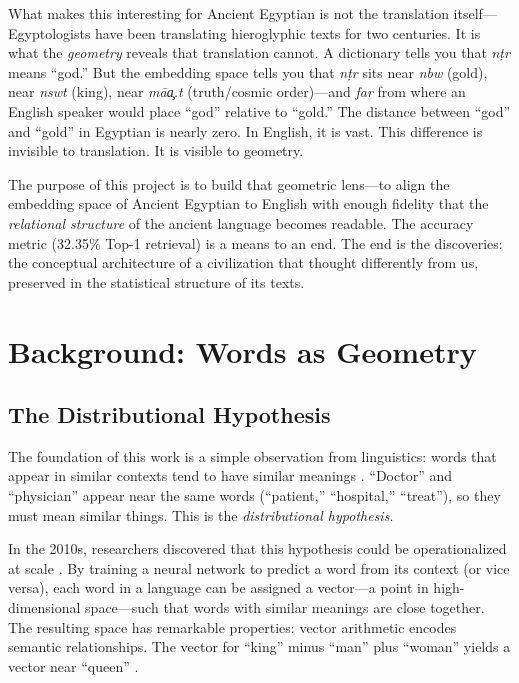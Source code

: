 \documentclass[11pt, a4paper]{article}
\begin{document}
What makes this interesting for Ancient Egyptian is not the translation itself---Egyptologists have been translating hieroglyphic texts for two centuries. It is what the \textit{geometry} reveals that translation cannot. A dictionary tells you that \textit{n\d{t}r} means ``god.'' But the embedding space tells you that \textit{n\d{t}r} sits near \textit{nbw} (gold), near \textit{nswt} (king), near \textit{m\=a\c{a}.t} (truth/cosmic order)---and \textit{far} from where an English speaker would place ``god'' relative to ``gold.'' The distance between ``god'' and ``gold'' in Egyptian is nearly zero. In English, it is vast. This difference is invisible to translation. It is visible to geometry.

The purpose of this project is to build that geometric lens---to align the embedding space of Ancient Egyptian to English with enough fidelity that the \textit{relational structure} of the ancient language becomes readable. The accuracy metric (32.35\% Top-1 retrieval) is a means to an end. The end is the discoveries: the conceptual architecture of a civilization that thought differently from us, preserved in the statistical structure of its texts.

\section{Background: Words as Geometry}
\label{sec:background}

\subsection{The Distributional Hypothesis}

The foundation of this work is a simple observation from linguistics: words that appear in similar contexts tend to have similar meanings \citep{harris1954distributional, firth1957synopsis}. ``Doctor'' and ``physician'' appear near the same words (``patient,'' ``hospital,'' ``treat''), so they must mean similar things. This is the \textit{distributional hypothesis}.

In the 2010s, researchers discovered that this hypothesis could be operationalized at scale \citep{mikolov2013efficient}. By training a neural network to predict a word from its context (or vice versa), each word in a language can be assigned a vector---a point in high-dimensional space---such that words with similar meanings are close together. The resulting space has remarkable properties: vector arithmetic encodes semantic relationships. The vector for ``king'' minus ``man'' plus ``woman'' yields a vector near ``queen'' \citep{mikolov2013linguistic}.
\end{document}
